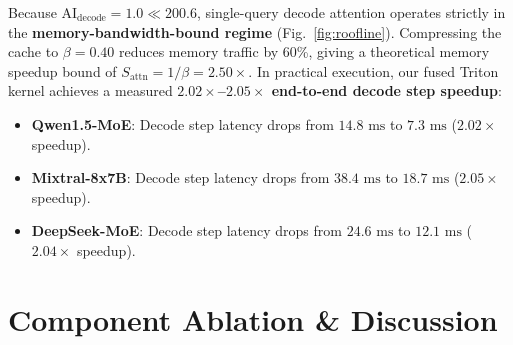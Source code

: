 \documentclass[conference]{IEEEtran}
\begin{document}
Because $\text{AI}_{\text{decode}} = 1.0 \ll 200.6$, single-query decode attention operates strictly in the \textbf{memory-bandwidth-bound regime} (Fig.~\ref{fig:roofline}). Compressing the cache to $\beta = 0.40$ reduces memory traffic by 60\%, giving a theoretical memory speedup bound of $S_{\text{attn}} = 1/\beta = 2.50\times$. In practical execution, our fused Triton kernel achieves a measured \textbf{$2.02\times$--$2.05\times$ end-to-end decode step speedup}:
\begin{itemize}
    \item \textbf{Qwen1.5-MoE}: Decode step latency drops from $14.8\text{ ms}$ to $7.3\text{ ms}$ ($2.02\times$ speedup).
    \item \textbf{Mixtral-8x7B}: Decode step latency drops from $38.4\text{ ms}$ to $18.7\text{ ms}$ ($2.05\times$ speedup).
    \item \textbf{DeepSeek-MoE}: Decode step latency drops from $24.6\text{ ms}$ to $12.1\text{ ms}$ ($2.04\times$ speedup).
\end{itemize}

\section{Component Ablation \& Discussion}

\begin{table}[t]
\centering
\caption{Component ablation on Qwen1.5-MoE-A2.7B at 40\% budget. Values report mean and [95\% bootstrap CI].}
\label{tab:ablation}
\end{table}
\end{document}

